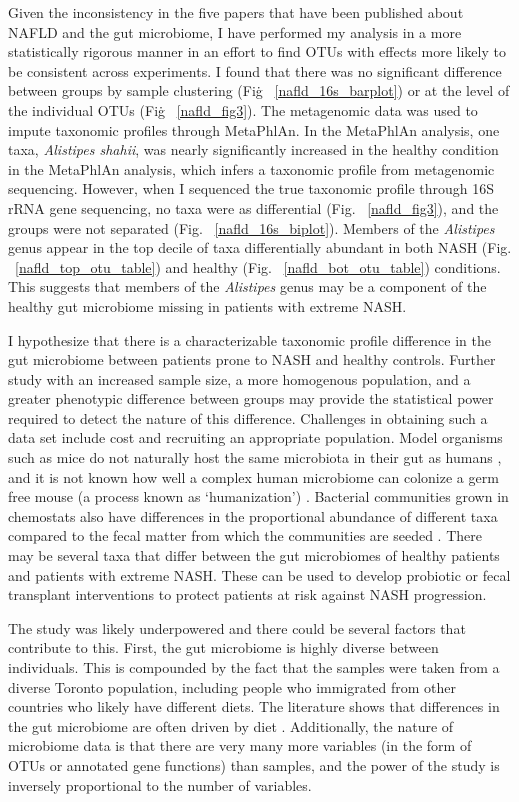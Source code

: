 Given the inconsistency in the five papers that have been published about NAFLD and the gut microbiome, I have performed my analysis in a more statistically rigorous manner in an effort to find OTUs with effects more likely to be consistent across experiments. I found that there was no significant difference between groups by sample clustering (Fig\. ~\ref{nafld_16s_barplot}) or at the level of the individual OTUs (Fig\. ~\ref{nafld_fig3}). The metagenomic data was used to impute taxonomic profiles through MetaPhlAn. In the MetaPhlAn analysis, one taxa, \textit{Alistipes shahii}, was nearly significantly increased in the healthy condition in the MetaPhlAn analysis, which infers a taxonomic profile from metagenomic sequencing. However, when I sequenced the true taxonomic profile through 16S rRNA gene sequencing, no taxa were as differential (Fig. ~\ref{nafld_fig3}), and the groups were not separated (Fig. ~\ref{nafld_16s_biplot}). Members of the \textit{Alistipes} genus appear in the top decile of taxa differentially abundant in both NASH (Fig. ~\ref{nafld_top_otu_table}) and healthy (Fig. ~\ref{nafld_bot_otu_table}) conditions. This suggests that members of the \textit{Alistipes} genus may be a component of the healthy gut microbiome missing in patients with extreme NASH.

I hypothesize that there is a characterizable taxonomic profile difference in the gut microbiome between patients prone to NASH and healthy controls. Further study with an increased sample size, a more homogenous population, and a greater phenotypic difference between groups may provide the statistical power required to detect the nature of this difference. Challenges in obtaining such a data set include cost and recruiting an appropriate population. Model organisms such as mice do not naturally host the same microbiota in their gut as humans \cite{nguyen2015informative}, and it is not known how well a complex human microbiome can colonize a germ free mouse (a process known as `humanization') \cite{clavel2016mouse}. Bacterial communities grown in chemostats also have differences in the proportional abundance of different taxa compared to the fecal matter from which the communities are seeded \cite{mcdonald2013evaluation}. There may be several taxa that differ between the gut microbiomes of healthy patients and patients with extreme NASH. These can be used to develop probiotic or fecal transplant interventions to protect patients at risk against NASH progression.

The study was likely underpowered and there could be several factors that contribute to this. First, the gut microbiome is highly diverse between individuals. This is compounded by the fact that the samples were taken from a diverse Toronto population, including people who immigrated from other countries who likely have different diets. The literature shows that differences in the gut microbiome are often driven by diet \cite{david2014diet}. Additionally, the nature of microbiome data is that there are very many more variables (in the form of OTUs or annotated gene functions) than samples, and the power of the study is inversely proportional to the number of variables.

